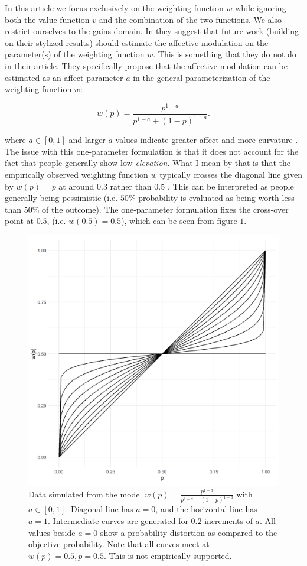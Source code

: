 \documentclass[12pt]{article}
\begin{document}
In this article we focus exclusively on the
weighting function $w$ while ignoring both
the value function $v$ and the combination
of the two functions. We also restrict ourselves
to the gains domain.
In \textcite{rottenstreich2001money} they
suggest that future work (building on their
stylized results) should estimate the affective
modulation on the parameter(s) of the
weighting function $w$. This is something
that they do not do in their article.
They specifically
propose that the affective modulation can
be estimated as an affect parameter $a$
in the general parameterization of the weighting
function $w$:

\[
	w(p) = \frac{p^{1-a}}
	{p^{1-a}+(1-p)^{1-a}}
.\]

where $a \in [0, 1]$ and larger $a$ values indicate
greater affect
and more curvature \autocite{rottenstreich2001money}.
The issue with this one-parameter
formulation is that it
does not account for the fact that people
generally show low \emph{elevation}.
What I mean by that is that the empirically
observed weighting function $w$ typically
crosses the diagonal line given by $w(p) = p$
at around $0.3$ rather than $0.5$
\autocite{gonzalez1999shape}. This can be
interpreted as people generally being
pessimistic (i.e. $50\%$ probability is
evaluated as being worth less than  $50\%$
of the outcome).
The one-parameter
formulation fixes the
cross-over point at $0.5$,
(i.e. $w(0.5) = 0.5$),
which can be seen from figure $1$.

\begin{figure}[H]
	\includegraphics[width = \linewidth]{../Figures/oneParam.png}
	\caption{Data simulated from the model
		$w(p) = \frac{p^{1-a}}
		{p^{1-a}+(1-p)^{1-a}}$ with
		$a \in [0, 1]$. Diagonal line has
		$a = 0$, and the horizontal line
		has $a = 1$. Intermediate curves
		are generated for $0.2$ increments
		of $a$. All values beside
		$a = 0$ show a probability distortion
		as compared to the objective probability.
		Note that all curves meet at
		$w(p) = 0.5, p = 0.5$. This is
	not empirically supported.}
\end{figure}
\end{document}
